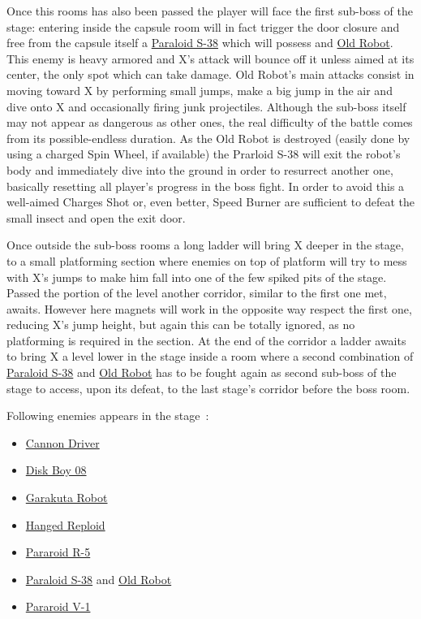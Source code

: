 Once this rooms has also been passed the player will face the first sub-boss of the stage: entering inside the capsule room will in fact trigger the door closure and free from the capsule itself a \hyperlink{miniboss:Paraloid_S-38}{Paraloid S-38} which will possess and \hyperlink{miniboss:Old_robot}{Old Robot}. This enemy is heavy armored and X's attack will bounce off it unless aimed at its center, the only spot which can take damage. Old Robot's main attacks consist in moving toward X by performing small jumps, make a big jump in the air and dive onto X and occasionally firing junk projectiles. Although the sub-boss itself may not appear as dangerous as other ones, the real difficulty of the battle comes from its possible-endless duration. As the Old Robot is destroyed (easily done by using a charged Spin Wheel, if available) the Prarloid S-38 will exit the robot's body and immediately dive into the ground in order to resurrect another one, basically resetting all player's progress in the boss fight. In order to avoid this a well-aimed Charges Shot or, even better, Speed Burner are sufficient to defeat the small insect and open the exit door.

Once outside the sub-boss rooms a long ladder will bring X deeper in the stage, to a small platforming section where enemies on top of platform will try to mess with X's jumps to make him fall into one of the few spiked pits of the stage. Passed the portion of the level another corridor, similar to the first one met, awaits. However here magnets will work in the opposite way respect the first one, reducing X's jump height, but again this can be totally ignored, as no platforming is required in the section. At the end of the corridor a ladder awaits to bring X a level lower in the stage inside a room where a second combination of  \hyperlink{miniboss:Paraloid_S-38}{Paraloid S-38} and \hyperlink{miniboss:Old_robot}{Old Robot} has to be fought again as second sub-boss of the stage to access, upon its defeat, to the last stage's corridor before the boss room.

Following enemies appears in the stage~\cite{wiki:Robot_Junkyard}:
\begin{itemize}

	\item \hyperlink {enem:Cannon_Driver}{Cannon Driver}
	\item \hyperlink {enem:Disk_Boy_08}{Disk Boy 08}
	\item \hyperlink {enem:Garakuta_Robot}{Garakuta Robot} 
	\item \hyperlink {enem:Hanged_Reploid}{Hanged Reploid}
	\item \hyperlink {enem:Pararoid_R-5}{Pararoid R-5}
	\item \hyperlink {miniboss:Paraloid_S-38}{Paraloid S-38} and \hyperlink{miniboss:Old_robot}{Old Robot}
	\item \hyperlink {enem:Pararoid_V-1}{Pararoid V-1}
\end{itemize}


